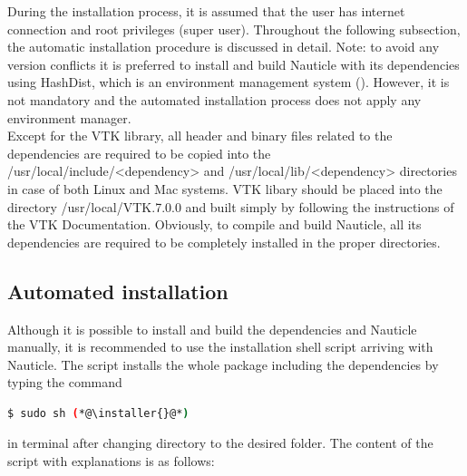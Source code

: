 \documentclass[a4paper,12pt,openany]{book}
\newcommand{\myhref}[3][nauticlegreen_dark]{\href{#2}{\color{#1}{#3}}}%
\theoremstyle{break}
\begin{document}
During the installation process, it is assumed that the user has internet connection and root privileges (super user). Throughout the following subsection, the automatic installation procedure is discussed in detail.
Note: to avoid any version conflicts it is preferred to install and build Nauticle with its dependencies using HashDist, which is an environment management system (\myhref{https://github.com/hashdist/hashdist}{https://github.com/hashdist/ hashdist}). However, it is not mandatory and the automated installation process does not apply any environment manager. \\
Except for the VTK library, all header and binary files related to the dependencies are required to be copied into the /usr/local/include/<dependency> and /usr/local/lib/<dependency> directories in case of both Linux and Mac systems. VTK libary should be placed into the directory /usr/local/VTK.7.0.0 and built simply by following the instructions of the VTK Documentation. Obviously, to compile and build Nauticle, all its dependencies are required to be completely installed in the proper directories. 
\subsection{Automated installation}
Although it is possible to install and build the dependencies and Nauticle manually, it is recommended to use the installation shell script arriving with Nauticle. The script installs the whole package including the dependencies by typing the command
\begin{lstlisting}[language=bash]
  $ sudo sh (*@\installer{}@*)
\end{lstlisting}
in terminal after changing directory to the desired folder. The content of the script with explanations is as follows:
\end{document}
